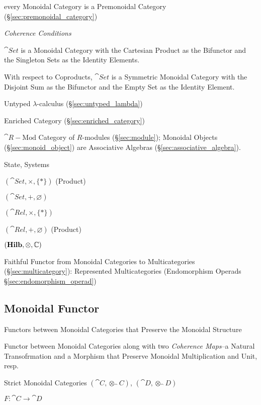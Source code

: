 every Monoidal Category is a Premonoidal Category
(\S\ref{sec:premonoidal_category})

\emph{Coherence Conditions}

$\cat{Set}$ is a Monoidal Category with the Cartesian Product as
the Bifunctor and the Singleton Sets as the Identity Elements.

With respect to Coproducts, $\cat{Set}$ is a Symmetric Monoidal
Category with the Disjoint Sum as the Bifunctor and the Empty
Set as the Identity Element.

Untyped $\lambda$-calculus (\S\ref{sec:untyped_lambda})

Enriched Category (\S\ref{sec:enriched_category})

$\cat{R-\text{Mod}}$ Category of $R$-modules (\S\ref{sec:module});
Monoidal Objects (\S\ref{sec:monoid_object}) are Associative Algebras
(\S\ref{sec:associative_algebra}).

State, Systems %

$(\cat{Set}, \times, \{*\})$ (Product)

$(\cat{Set}, +, \varnothing)$

$(\cat{Rel}, \times, \{*\})$

$(\cat{Rel}, +, \varnothing)$ (Product)

$(\mathbf{Hilb}, \otimes, \mathbb{C})$

Faithful Functor from Monoidal Categories to Multicategories
(\S\ref{sec:multicategory}): Represented Multicategories (Endomorphism
Operads \S\ref{sec:endomorphism_operad})



\subsection{Monoidal Functor}\label{sec:monoidal_functor}

Functors between Monoidal Categories that Preserve the Monoidal
Structure

Functor between Monoidal Categories along with two \emph{Coherence
  Maps}--a Natural Transofrmation and a Morphism that Preserve
Monoidal Multiplication and Unit, resp.

Strict Monoidal Categories $(\cat{C},\otimes_\cat{C})$,
$(\cat{D},\otimes_\cat{D})$

$F : \cat{C} \rightarrow \cat{D}$


